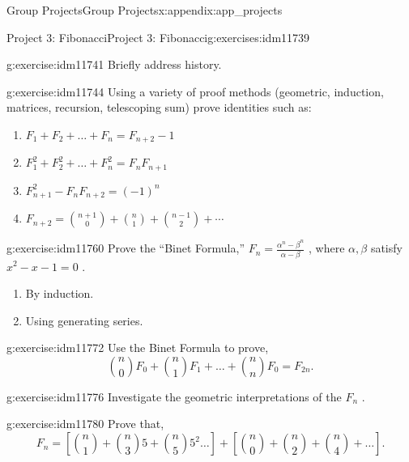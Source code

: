 \documentclass[oneside,10pt,]{book}
\numberwithin{equation}{chapter}
\begin{document}
\begin{appendixptx}{Group Projects}{}{Group Projects}{}{}{x:appendix:app_projects}
%
\begin{exercises-section-numberless}{Project 3: Fibonacci}{}{Project 3: Fibonacci}{}{}{g:exercises:idm11739}
\begin{divisionexercise}{1}{}{}{g:exercise:idm11741}%
Briefly address history.%
\end{divisionexercise}%
\begin{divisionexercise}{2}{}{}{g:exercise:idm11744}%
Using a variety of proof methods (geometric, induction, matrices, recursion, telescoping sum) prove identities such as:%
\begin{enumerate}[label=(\alph*)]
\item{}\(F_{1} + F_{2} + \ldots + F_{n} = F_{n + 2} - 1\)%
\item{}\(F_{1}^{2} + F_{2}^{2} + \ldots + F_{n}^{2} = F_{n}F_{n + 1}\)%
\item{}\(F_{n + 1}^{2} - F_{n}F_{n + 2} = \left( - 1 \right)^{n}\)%
\item{}\(F_{n + 2} = \binom{n + 1}{0} + \binom{n}{1} + \binom{n - 1}{2} + \cdots\)%
\end{enumerate}
%
\end{divisionexercise}%
\begin{divisionexercise}{3}{}{}{g:exercise:idm11760}%
Prove the ``Binet Formula,'' \(F_{n} = \frac{\alpha^{n} - \beta^{n}}{\alpha - \beta}\) , where \(\alpha,\beta\) satisfy \(x^{2} - x - 1 = 0\) .%
\begin{enumerate}[label=(\alph*)]
\item{}By induction.%
\item{}Using generating series.%
\end{enumerate}
%
\end{divisionexercise}%
\begin{divisionexercise}{4}{}{}{g:exercise:idm11772}%
Use the Binet Formula to prove,%
\begin{equation*}
\binom{n}{0}F_{0} + \binom{n}{1} F_{1} + \ldots + \binom{n}{n}F_{0} = F_{2n}.
\end{equation*}
%
\end{divisionexercise}%
\begin{divisionexercise}{5}{}{}{g:exercise:idm11776}%
Investigate the geometric interpretations of the \(F_{n}\) .%
\end{divisionexercise}%
\begin{divisionexercise}{6}{}{}{g:exercise:idm11780}%
Prove that,%
\begin{equation*}
F_{n} = \left\lbrack \binom{n}{1}  + \binom{n}{3} 5 + \binom{n}{5} 5^{2}\ldots \right\rbrack + \left\lbrack \binom{n}{0}  + \binom{n}{2}  + \binom{n}{4}  + \ldots \right\rbrack.

\end{equation*}
\end{divisionexercise}
\end{exercises-section-numberless}
\end{appendixptx}
\end{document}
